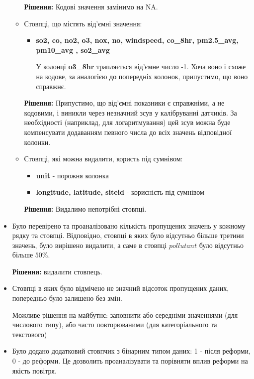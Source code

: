 \documentclass{article}
\begin{document}
\begin{itemize}
\begin{itemize}
            \textbf{ Рішення:} Кодові значення замінимо на NA.

             \item Стовпці, що містять від'ємні значення:
             \begin{itemize}
                \item \textbf{so2, co, no2,  o3, nox, no, windspeed, co\_8hr, pm2.5\_avg, pm10\_avg , so2\_avg} 

                У колонці \textbf{o3\_8hr} трапляється від'ємне число -1. Хоча воно і схоже на кодове, за аналогією до попередніх колонок, припустимо, що воно справжнє.
             \end{itemize}

             \textbf{Рішення:} Припустимо, що від'ємні показники є справжніми, а не кодовими, і виникли через незначний зсув у калібруванні датчиків. За необхідності (наприклад, для логаритмування) цей зсув можна буде компенсувати додаванням певного числа до всіх значень відповідної колонки.
             
             \item Стовпці, які можна видалити, користь під сумнівом:
             \begin{itemize}
                 \item \textbf{unit} - порожня колонка
                 \item \textbf{longitude, latitude, siteid}  - корисність під сумнівом
             \end{itemize}
             
             \textbf{Рішення:} Видалимо непотрібні стовпці.
         \end{itemize}
    
    \item Було перевірено та проаналізовано кількість пропущених значень у кожному рядку та стовпці. Відповідно, стовпці в яких було відсутньо більше третини значень, було вирішено видалити, а саме в стовпці $pollutant$ було відсутньо більше $50\%$.
    
    \textbf{Рішення:} видалити стовпець.
    
    \item Стовпці в яких було відмічено не значний відсоток пропущених даних, попередньо було залишено без змін. 
    
    Можливе рішення на майбутнє: заповнити або середніми значеннями (для числового типу), або часто повторюваними (для категоріального та текстового) 
    
    \item Було додано додатковий стовпчик з бінарним типом даних: 1 - після реформи, 0 - до реформи. Це дозволить проаналізувати та порівняти вплив реформи на якість повітря.
\end{itemize}
\end{document}
